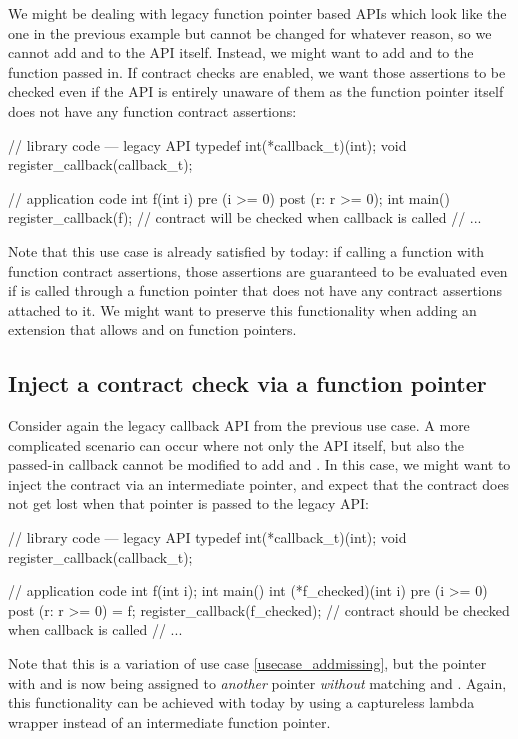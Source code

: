 We might be dealing with legacy function pointer based APIs which look like the one in the previous example but cannot be changed for whatever reason, so we cannot add  and  to the API itself. Instead, we might want to add  and  to the function passed in. If contract checks are enabled, we want those assertions to be checked even if the API is entirely unaware of them as the function pointer itself does not have any function contract assertions:
\begin{codeblock}
// library code --- legacy API
typedef int(*callback_t)(int);
void register_callback(callback_t);

// application code
int f(int i) pre (i >= 0) post (r: r >= 0); 
int main() {
  register_callback(f);  // contract will be checked when callback is called
  // ...
}
\end{codeblock}
Note that this use case is already satisfied by \cite{P2900R8} today: if calling a function  with function contract assertions, those assertions are guaranteed to be evaluated even if  is called through a function pointer that does not have any contract assertions attached to it. We might want to preserve this functionality when adding an extension that allows  and  on function pointers.


\subsection{Inject a contract check via a function pointer}
\label{usecase_inject}
Consider again the legacy callback API from the previous use case. A more complicated scenario can occur where not only the API itself, but also the passed-in callback  cannot be modified to add  and . In this case, we might want to inject the contract via an intermediate pointer, and expect that the contract does not get lost when that pointer is passed to the legacy API:
\begin{codeblock}
// library code --- legacy API
typedef int(*callback_t)(int);
void register_callback(callback_t);

// application code
int f(int i); 
int main() {
  int (*f_checked)(int i) pre (i >= 0) post (r: r >= 0) = f;
  register_callback(f_checked);  // contract should be checked when callback is called
  // ...
}
\end{codeblock}
Note that this is a variation of use case \ref{usecase_addmissing}, but the pointer with  and  is now being assigned to \emph{another} pointer \emph{without} matching  and . Again, this functionality can be achieved with  today by using a captureless lambda wrapper instead of an intermediate function pointer.

